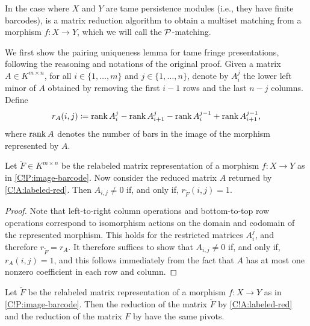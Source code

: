 In the case where $X$ and $Y$ are tame persistence modules (i.e., they have finite barcodes), \cite[Algorithm 1]{GST2025} is a matrix reduction algorithm to obtain a multiset matching from a morphism $f \colon X \to Y$, which we will call the $\mathcal{P}$-matching.

We first show the pairing uniqueness lemma \cite{CSEM2006} for tame fringe presentations, following the reasoning and notations of the original proof. Given a matrix $A \in K^{m \times n}$, for all $i \in \{1, \ldots, m\}$ and $j \in \{1, \ldots, n\}$, denote by $A_i^j$ the lower left minor of $A$ obtained by removing the first $i - 1$ rows and the last $n - j$ columns. Define
\[
  r_A(i, j) \coloneq \operatorname{rank} A_i^j - \operatorname{rank} A_{i + 1}^j - \operatorname{rank} A_i^{j - 1} + \operatorname{rank} A_{i + 1}^{j - 1},
\]
where $\operatorname{rank} A$ denotes the number of bars in the image of the morphism represented by $A$.

\begin{lemma}
\label{C!L:pairing-uniqueness}
  Let $\tilde{F} \in K^{m \times n}$ be the relabeled matrix representation of a morphism $f \colon X \to Y$ as in \cref{C!P:image-barcode}. Now consider the reduced matrix $A$ returned by \cref{C!A:labeled-red}. Then $A_{i, j} \neq 0$ if, and only if, $r_{\tilde{F}}(i, j) = 1$.
\end{lemma}

\begin{proof}
  Note that left-to-right column operations and bottom-to-top row operations correspond to isomorphism actions on the domain and codomain of the represented morphism. This holds for the restricted matrices $A_i^j$, and therefore $r_{\tilde{F}} = r_A$. It therefore suffices to show that $A_{i, j} \neq 0$ if, and only if, $r_A(i, j) = 1$, and this follows immediately from the fact that $A$ has at most one nonzero coefficient in each row and column.
\end{proof}

\begin{proposition}
  Let $\tilde{F}$ be the relabeled matrix representation of a morphism $f \colon X \to Y$ as in \cref{C!P:image-barcode}. Then the reduction of the matrix $\tilde{F}$ by \cref{C!A:labeled-red} and the reduction of the matrix $F$ by \cite[Algorithm 1]{GST2025} have the same pivots.
\end{proposition}

